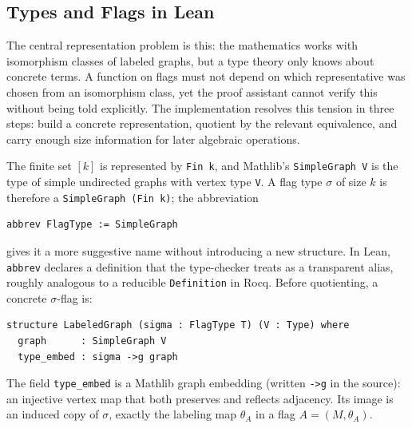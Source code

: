 \documentclass{article}
\newcommand{\lean}[1]{\texttt{#1}}
\begin{document}
\subsection{Types and Flags in Lean}

The central representation problem is this: the mathematics works with
isomorphism classes of labeled graphs, but a type theory only knows about
concrete terms.  A function on flags must not depend on which representative
was chosen from an isomorphism class, yet the proof assistant cannot verify
this without being told explicitly.  The implementation resolves this tension
in three steps: build a concrete representation, quotient by the relevant
equivalence, and carry enough size information for later algebraic operations.

The finite set $[k]$ is represented by \lean{Fin k}, and Mathlib's
\lean{SimpleGraph V} is the type of simple undirected graphs with vertex type
\lean{V}.  A flag type $\sigma$ of size $k$ is therefore a
\lean{SimpleGraph (Fin k)}; the abbreviation
\begin{lstlisting}
abbrev FlagType := SimpleGraph
\end{lstlisting}
gives it a more suggestive name without introducing a new structure.  In Lean,
\lean{abbrev} declares a definition that the type-checker treats as a
transparent alias, roughly analogous to a reducible \lean{Definition} in Rocq.
Before quotienting, a concrete $\sigma$-flag is:
\begin{lstlisting}
structure LabeledGraph (sigma : FlagType T) (V : Type) where
  graph      : SimpleGraph V
  type_embed : sigma ->g graph
\end{lstlisting}
The field \lean{type\_embed} is a Mathlib graph embedding (written \lean{->g}
in the source): an injective vertex map that both preserves and reflects
adjacency.  Its image is an induced copy of $\sigma$, exactly the labeling map
$\theta_A$ in a flag $A = (M, \theta_A)$.
\end{document}
